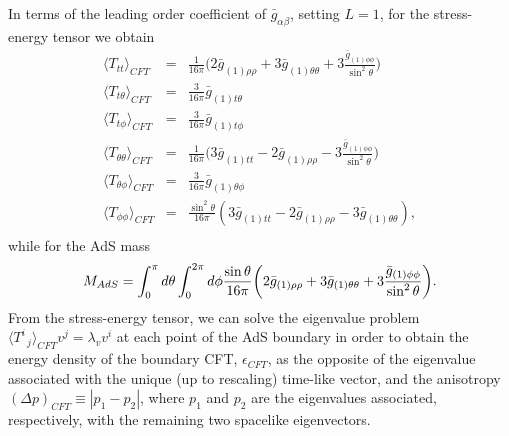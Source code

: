 \documentclass[a4paper,11pt]{article}
\numberwithin{equation}{section}
\begin{document}
In terms of the leading order coefficient of $\bar{g}_{\alpha\beta}$, setting $L=1$, for the stress-energy tensor we obtain
\begin{eqnarray}
\langle T_{tt}\rangle_{CFT}&=&\frac{1}{16\pi} \biggl(2\bar{g}_{(1)\rho\rho}+3\bar{g}_{(1)\theta\theta}+3\frac{\bar{g}_{(1)\phi\phi}}{\sin^2\theta}\biggr) \nonumber \\
\langle T_{t\theta}\rangle_{CFT}&=&\frac{3}{16\pi}\bar{g}_{(1)t\theta} \nonumber \\
\langle T_{t\phi}\rangle_{CFT}&=&\frac{3}{16\pi}\bar{g}_{(1)t\phi} \nonumber \\
\langle T_{\theta\theta}\rangle_{CFT}&=&\frac{1}{16\pi} \biggl(3\bar{g}_{(1)tt}-2\bar{g}_{(1)\rho\rho}-3\frac{\bar{g}_{(1)\phi\phi}}{\sin^2\theta}\biggr) \nonumber \\
\langle T_{\theta\phi}\rangle_{CFT}&=&\frac{3}{16\pi}\bar{g}_{(1)\theta\phi} \nonumber \\
\langle T_{\phi\phi}\rangle_{CFT}&=&\frac{\sin^2\theta}{16\pi} (3\bar{g}_{(1)tt}-2\bar{g}_{(1)\rho\rho}-3\bar{g}_{(1)\theta\theta}), \nonumber \\
\end{eqnarray}
while for the AdS mass
\begin{equation}
\label{eq:AdSmasscalc}
M_{AdS}=\int_0^\pi d\theta \int_0^{2\pi}d\phi\frac{\sin\theta}{16\pi} \biggl(2\bar{g}_{(1)\rho\rho}+3\bar{g}_{(1)\theta\theta}+3\frac{\bar{g}_{(1)\phi\phi}}{\sin^2\theta}\biggr) \nonumber. \\
\end{equation}
From the stress-energy tensor, we can solve the eigenvalue problem $\langle T^i_{\;\;j}\rangle_{CFT} v^j=\lambda_v v^i$ at each point of the AdS boundary in order to obtain the energy density of the boundary CFT, $\epsilon_{CFT}$, as the opposite of the eigenvalue associated with the unique (up to rescaling) time-like vector, and the anisotropy $(\Delta p)_{CFT}\equiv|p_1-p_2|$, where $p_1$ and $p_2$ are the eigenvalues associated, respectively, with the remaining two spacelike eigenvectors.
\end{document}
